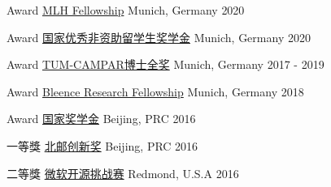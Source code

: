 




\begin{cvhonors}

\cvhonor
{Award} %
{\href{https://fellowship.mlh.io/}{MLH Fellowship} } %
{Munich, Germany} %
{2020} %

\cvhonor
{Award} %
{\href{}{国家优秀非资助留学生奖学金} } %
{Munich, Germany} %
{2020} %

\cvhonor
{Award} %
{\href{}{TUM-CAMPAR博士全奖} } %
{Munich, Germany} %
{2017 - 2019} %

\cvhonor
{Award} %
{\href{https://bleenco.com/}{Bleence Research Fellowship} } %
{Munich, Germany} %
{2018} %

\cvhonor
{Award} %
{\href{http://sice.bupt.edu.cn/info/1008/1546.htm}{国家奖学金}} %
{Beijing, PRC} %
{2016} %

\cvhonor
{一等獎} %
{\href{http://my.bupt.edu.cn/detach.portal?.pmn=view&action=browser&.ia=false&.pen=pe1144&bulletinId=fc089be9-6d81-11e6-ae27-4f4915a784ea}{北邮创新奖}} %
{Beijing, PRC} %
{2016} %


\cvhonor
{二等獎} %
{\href{https://www.microsoft.com/en-us/research/academic-program/microsoft-open-source-challenge/}{微软开源挑战赛}} %
{Redmond, U.S.A} %
{2016} %



\end{cvhonors}
